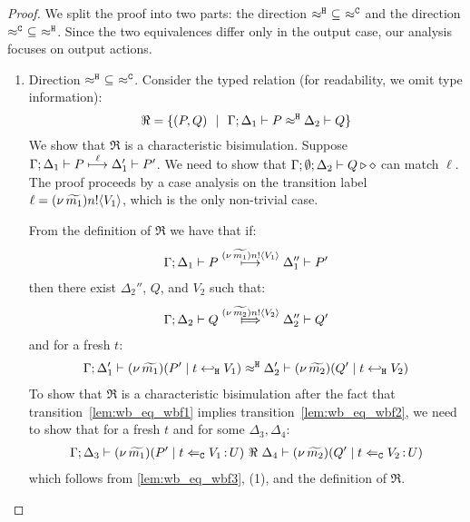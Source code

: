 \begin{proof}
	\noi
	We split the proof into two parts: the direction
	$\approx^\mathtt{H}\ \subseteq\ \approx^\mathtt{C}$ and the direction
	$\approx^\mathtt{C}\ \subseteq\ \approx^\mathtt{H}$.
 Since the two equivalences differ only in the output case, our analysis focuses on output actions.

	\begin{enumerate}[1.]
		\item	Direction $\approx^\mathtt{H}\ \subseteq\ \approx^\mathtt{C}$. Consider the typed relation (for readability, we omit type information):
				\[
					\Re = \{
								(P, Q) 
								\ \ |\ \ 
								\Gamma; \Delta_1 \vdash P \approx^\mathtt{H} \Delta_2 \vdash Q\}
				\]
				We show that $\Re$ is a characteristic bisimulation.
				Suppose
				$
						\Gamma; \Delta_1 \vdash P \stackrel{ \ell}{\longmapsto} \Delta_1' \vdash P'
				$.
				We need to show that $\Gamma; \emptyset; \Delta_2 \vdash Q \triangleright \diamond$
				can match  $\ell$.
				The proof proceeds by a case analysis on the transition label $\ell = (\nu\, \widetilde{m_1}) n ! \langle V_1 \rangle$, which is the only non-trivial case.

							\smallskip
							
							 From the definition of $\Re$ we have that if:
							\begin{eqnarray}
								\Gamma; \Delta_1 \vdash P \stackrel{(\nu\, \widetilde{m_1}) n ! \langle V_1 \rangle}{\longmapsto} \Delta_1'' \vdash P'
								\label{lem:wb_eq_wbf1}
							\end{eqnarray}
							then there exist $\Delta_2''$, $Q$, and $V_2$ such that:
							\begin{eqnarray}
								\horel{\Gamma}{\Delta_2}{Q}{\Hby{\news{\widetilde{m_2}} \bactout{n}{V_2}}}{\Delta_2''}{Q'}
								\label{lem:wb_eq_wbf2}
							\end{eqnarray}
							and for a fresh $t$:
							\begin{eqnarray}
								\Gamma; \Delta_1' \vdash (\nu\, \widetilde{m_1})(P' \;|\; t \hookleftarrow_{\mathtt{H}} V_1) \approx^\mathtt{H} \Delta_2' \vdash (\nu\, \widetilde{m_2})(Q' \;|\; t \hookleftarrow_{\mathtt{H}} V_2 )
								\label{lem:wb_eq_wbf3}
							\end{eqnarray}
							\noi 
							To show that $\Re$ is a characteristic bisimulation
							after the fact that transition~\eqref{lem:wb_eq_wbf1} implies transition~\eqref{lem:wb_eq_wbf2},
							we need to show that for a fresh $t$ and for some $\Delta_3, \Delta_4$:
							\begin{eqnarray}
								\Gamma; \Delta_3 \vdash (\nu\, \widetilde{m_1})(P' \;|\; t \Leftarrow_{\mathtt{C}} V_1{\,:\,}U) \ \Re\  \Delta_4 \vdash (\nu\, \widetilde{m_2})(Q' \;|\; t \Leftarrow_{\mathtt{C}} V_2{\,:\,}U)
								\label{lem:wb_eq_wbf4}
							\end{eqnarray}
							\noi which follows from \eqref{lem:wb_eq_wbf3}, (1),
							and the definition of $\Re$.


\end{enumerate}
\end{proof}
